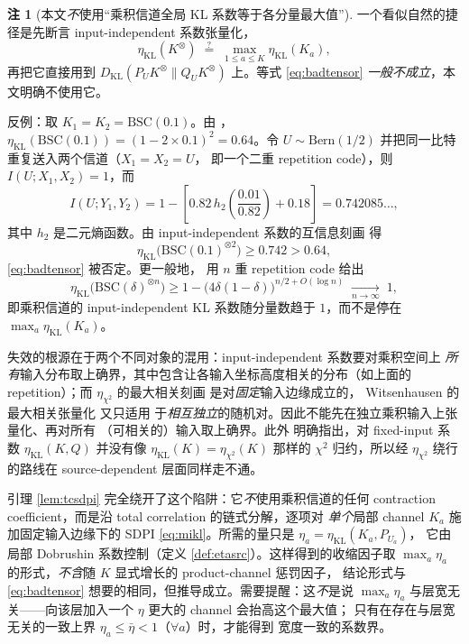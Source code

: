 \documentclass[a4paper,11pt]{article}
\theoremstyle{definition}
\newtheorem{remark}{注}
\newcommand{\1}{\mathbf 1}
\newcommand{\KL}{\mathrm{KL}}
\newcommand{\Kprod}{K^{\otimes}}
\begin{document}
\begin{remark}[本文\emph{不}使用“乘积信道全局 KL 系数等于各分量最大值”]
\label{rem:notensorize}
一个看似自然的捷径是先断言 input-independent 系数张量化，
\begin{equation}
\label{eq:badtensor}
\eta_{\KL}(\Kprod)\;\overset{?}{=}\;\max_{1\le a\le K}\eta_{\KL}(K_a),
\end{equation}
再把它直接用到 $D_{\KL}(P_U\Kprod\|Q_U\Kprod)$ 上。等式
\eqref{eq:badtensor} \emph{一般不成立}，本文明确不使用它。

反例：取 $K_1=K_2=\mathrm{BSC}(0.1)$。由
\cite[eq.~(16)]{PolyanskiyWu2017}，
$\eta_{\KL}(\mathrm{BSC}(0.1))=(1-2\times0.1)^2=0.64$。令
$U\sim\mathrm{Bern}(1/2)$ 并把同一比特重复送入两个信道（$X_1=X_2=U$，
即一个二重 repetition code），则 $I(U;X_1,X_2)=1$，而
\[
I(U;Y_1,Y_2)
=
1-\left[
0.82\,h_2\!\left(\frac{0.01}{0.82}\right)+0.18
\right]
=
0.742085\ldots,
\]
其中 $h_2$ 是二元熵函数。由 input-independent 系数的互信息刻画
\cite[eq.~(17)]{PolyanskiyWu2017} 得
\[
\eta_{\KL}\big(\mathrm{BSC}(0.1)^{\otimes2}\big)\ge0.742>0.64,
\]
\eqref{eq:badtensor} 被否定。更一般地，
\cite[eq.~(39)--(40)]{PolyanskiyWu2017} 用 $n$ 重 repetition code 给出
\[
\eta_{\KL}\big(\mathrm{BSC}(\delta)^{\otimes n}\big)
\ge
1-\big(4\delta(1-\delta)\big)^{n/2+O(\log n)}
\;\xrightarrow[n\to\infty]{}\;1,
\]
即乘积信道的 input-independent KL 系数随分量数趋于 $1$，而不是停在
$\max_a\eta_{\KL}(K_a)$。

失效的根源在于两个不同对象的混用：input-independent 系数要对乘积空间上
\emph{所有}输入分布取上确界，其中包含让各输入坐标高度相关的分布（如上面的
repetition）；而 $\eta_{\chi^2}$ 的最大相关刻画
\cite[eq.~(9)]{PolyanskiyWu2017} 是对\emph{固定}输入边缘成立的，
Witsenhausen 的最大相关张量化 \cite[Theorem 1]{Witsenhausen1975} 又只适用
于\emph{相互独立}的随机对。因此不能先在独立乘积输入上张量化、再对所有
（可相关的）输入取上确界。此外
\cite{PolyanskiyWu2017} 明确指出，对 fixed-input 系数
$\eta_{\KL}(K,Q)$ 并没有像 $\eta_{\KL}(K)=\eta_{\chi^2}(K)$
\cite[Theorem 3]{PolyanskiyWu2017} 那样的 $\chi^2$ 归约，所以经
$\eta_{\chi^2}$ 绕行的路线在 source-dependent 层面同样走不通。

引理 \ref{lem:tcsdpi} 完全绕开了这个陷阱：它\emph{不}使用乘积信道的任何
contraction coefficient，而是沿 total correlation 的链式分解，逐项对
\emph{单个}局部 channel $K_a$ 施加固定输入边缘下的 SDPI
\eqref{eq:mikl}。所需的量只是 $\eta_a=\eta_{\KL}(K_a,P_{U_a})$，
它由局部 Dobrushin 系数控制（定义 \ref{def:etasrc}）。这样得到的收缩因子取
$\max_a\eta_a$ 的形式，\emph{不含}随 $K$ 显式增长的 product-channel 惩罚因子，
结论形式与 \eqref{eq:badtensor} 想要的相同，但推导成立。需要提醒：这\emph{不}是说
$\max_a\eta_a$ 与层宽无关——向该层加入一个 $\eta$ 更大的 channel 会抬高这个最大值；
只有在存在与层宽无关的一致上界 $\eta_a\le\bar\eta<1$（$\forall a$）时，才能得到
宽度一致的系数界。
\end{remark}
\end{document}
